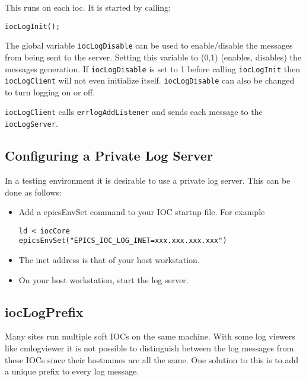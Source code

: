 This runs on each ioc.
It is started by calling:

\begin{verbatim}
iocLogInit();
\end{verbatim}

The global variable \verb|iocLogDisable| can be used to enable/disable the messages from being sent to the server.
Setting this variable to (0,1) (enables, disables) the messages generation.
If \verb|iocLogDisable| is set to 1 before calling \verb|iocLogInit| then \verb|iocLogClient| will not even initialize itself.
\verb|iocLogDisable| can also be changed to turn logging on or off.

\verb|iocLogClient| calls \verb|errlogAddListener| and sends each message to the \verb|iocLogServer|.

\subsection{Configuring a Private Log Server}

In a testing environment it is desirable to use a private log server.
This can be done as follows:

\begin{itemize}

\item Add a epicsEnvSet command to your IOC startup file.
For example

\begin{verbatim}
ld < iocCore
epicsEnvSet("EPICS_IOC_LOG_INET=xxx.xxx.xxx.xxx")
\end{verbatim}

\item The inet address is that of your host workstation.

\item On your host workstation, start the log server.

\end{itemize}

\subsection{iocLogPrefix}
\label{iocLogPrefix}

Many sites run multiple soft IOCs on the same machine.
With some log viewers like cmlogviewer it is not possible to distinguish between the log messages from these IOCs since their hostnames are all the same.
One solution to this is to add a unique prefix to every log message.

